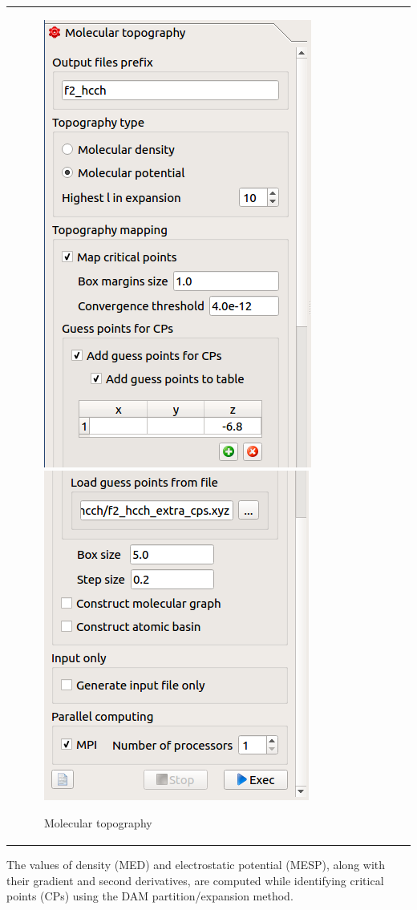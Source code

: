 \documentclass[10pt]{article}
\begin{document}
\begin{tabular}{lcr}
\begin{minipage}{.47\linewidth}
\begin{figure}[H]
\begin{center}
\includegraphics[width=.52\linewidth]{damqt_fig_2_6_1a.png}
\includegraphics[width=.52\linewidth]{damqt_fig_2_6_1b.png}
\end{center}
\caption{Molecular topography \label{fig:2_6_1}}
\end{figure}
\end{minipage}
\end{tabular}

\vspace*{5mm}

The values of density (MED) and electrostatic potential (MESP),
along with their gradient and second derivatives,
are computed while identifying critical points (CPs)
using the DAM partition/expansion method.
\end{document}
